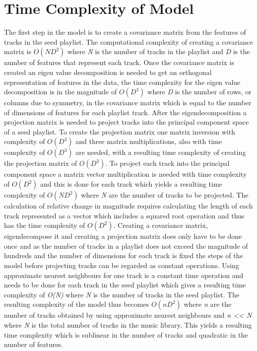 \documentclass[a4paper,11pt]{kth-mag}
\begin{document}
\section{Time Complexity of Model}
The first step in the model is to create a covariance matrix from the features of tracks in the seed playlist. The computational complexity of creating a covariance matrix is $O(ND^2)$ where \textit{N} is the number of tracks in the playlist and \textit{D} is the number of features that represent each track\cite{kwatra2010fast}. Once the covariance matrix is created an eigen value decomposition is needed to get an orthogonal representation of features in the data, the time complexity for the eigen value decomposition is in the magnitude of $O(D^3)$ where \textit{D} is the number of rows, or columns due to symmetry, in the covariance matrix which is equal to the number of dimensions of features for each playlist track\cite{pan1999complexity}. After the eigendecomposition a projection matrix is needed to project tracks into the principal component space of a seed playlist. To create the projection matrix one matrix inversion with complexity of $O(D^3)$ and three matrix multiplications, also with time complexity of $O(D^3)$ are needed, with a resulting time complexity of creating the projection matrix of $O(D^3)$. To project each track into the principal component space a matrix vector multiplication is needed with time complexity of $O(D^2)$ and this is done for each track which yields a resulting time complexity of $O(ND^2)$ where \textit{N} are the number of tracks to be projected. The calculation of relative change in magnitude requires calculating the length of each track represented as a vector which includes a squared root operation and thus has the time complexity of $O(D^2)$. Creating a covariance matrix, eigendecompose it and creating a projection matrix does only have to be done once and as the number of tracks in a playlist does not exceed the magnitude of hundreds and the number of dimensions for each track is fixed the steps of the model before projecting tracks can be regarded as constant operations. Using approximate nearest neighbours for one track is a constant time operation and needs to be done for each track in the seed playlist which gives a resulting time complexity of \textit{O(N)} where \textit{N} is the number of tracks in the seed playlist. The resulting complexity of the model thus becomes $O(nD^2)$ where \textit{n} are the number of tracks obtained by using approximate nearest neighbours and \textit{n << N} where \textit{N} is the total number of tracks in the music library. This yields a resulting time complexity which is sublinear in the number of tracks and quadratic in the number of features.
\end{document}
